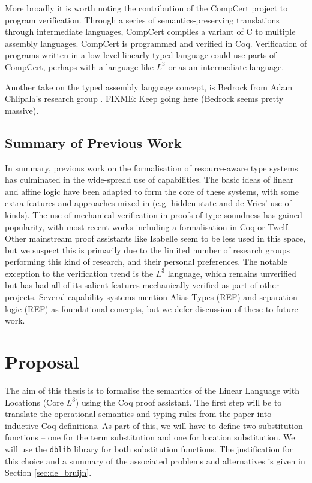 \documentclass[]{unswthesis}
\newcommand{\SSPHS}{\text{SSPHS }}
\begin{document}
More broadly it is worth noting the contribution of the CompCert \cite{leroy09} project to program verification. Through a series of semantics-preserving translations through intermediate languages, CompCert compiles a variant of C to multiple assembly languages. CompCert is programmed and verified in Coq. Verification of programs written in a low-level linearly-typed language could use parts of CompCert, perhaps with a language like $L^3$ or \SSPHS as an intermediate language.

Another take on the typed assembly language concept, is Bedrock from Adam Chlipala's research group \cite{chlipala11}. FIXME: Keep going here (Bedrock seems pretty massive).


\section{Summary of Previous Work}

In summary, previous work on the formalisation of resource-aware type systems has culminated in the wide-spread use of capabilities. The basic ideas of linear and affine logic have been adapted to form the core of these systems, with some extra features and approaches mixed in (e.g. hidden state and de Vries' use of kinds). The use of mechanical verification in proofs of type soundness has gained popularity, with most recent works including a formalisation in Coq or Twelf. Other mainstream proof assistants like Isabelle seem to be less used in this space, but we suspect this is primarily due to the limited number of research groups performing this kind of research, and their personal preferences. The notable exception to the verification trend is the $L^3$ language, which remains unverified but has had all of its salient features mechanically verified as part of other projects. Several capability systems mention Alias Types (REF) and separation logic (REF) as foundational concepts, but we defer discussion of these to future work.

\chapter{Proposal}
\label{ch:proposal}

The aim of this thesis is to formalise the semantics of the Linear Language with Locations (Core $L^3$) using the Coq proof assistant. The first step will be to translate the operational semantics and typing rules from the paper \cite{ahmed05} into inductive Coq definitions. As part of this, we will have to define two substitution functions -- one for the term substitution and one for location substitution. We will use the \texttt{dblib} library \cite{dblib13} for both substitution functions. The justification for this choice and a summary of the associated problems and alternatives is given in Section \ref{sec:de_bruijn}.
\end{document}
